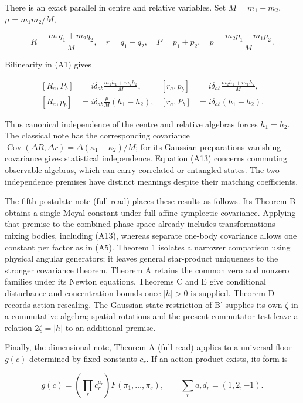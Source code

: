 \documentclass[11pt,a4paper]{article}
\begin{document}
There is an exact parallel in centre and relative variables. Set
\(M=m_1+m_2\), \(\mu=m_1m_2/M\),

\[
R=\frac{m_1q_1+m_2q_2}{M},\quad r=q_1-q_2,\quad
P=p_1+p_2,\quad p=\frac{m_2p_1-m_1p_2}{M}.
\]

Bilinearity in (A1) gives

\[
\begin{aligned}
{}[R_a,P_b]&=i\delta_{ab}\frac{m_1h_1+m_2h_2}{M},&
[r_a,p_b]&=i\delta_{ab}\frac{m_2h_1+m_1h_2}{M},\\
[R_a,p_b]&=i\delta_{ab}\frac{\mu}{M}(h_1-h_2),&
[r_a,P_b]&=i\delta_{ab}(h_1-h_2).
\end{aligned} \tag{A13}
\]

Thus canonical independence of the centre and relative algebras forces
\(h_1=h_2\). The classical note has the corresponding covariance
\(\operatorname{Cov}(\Delta R,\Delta r)=\Delta(\kappa_1-\kappa_2)/M\);
for its Gaussian preparations vanishing covariance gives statistical
independence. Equation (A13) concerns commuting observable algebras,
which can carry correlated or entangled states. The two independence
premises have distinct meanings despite their matching coefficients.

The \href{principia-fifth-postulate.md}{fifth-postulate note}
(full-read) places these results as follows. Its Theorem B obtains a
single Moyal constant under full affine symplectic covariance. Applying
that premise to the combined phase space already includes
transformations mixing bodies, including (A13), whereas separate
one-body covariance allows one constant per factor as in (A5). Theorem 1
isolates a narrower comparison using physical angular generators; it
leaves general star-product uniqueness to the stronger covariance
theorem. Theorem A retains the common zero and nonzero families under
its Newton equations. Theorems C and E give conditional disturbance and
concentration bounds once \(|h|>0\) is supplied. Theorem D records
action rescaling. The Gaussian state restriction of B' supplies its own
\(\zeta\) in a commutative algebra; spatial rotations and the present
commutator test leave a relation \(2\zeta=|h|\) to an additional
premise.

Finally, \href{action-unit-dimensional-selection.md}{the dimensional
note, Theorem A} (full-read) applies to a universal floor \(g(c)\)
determined by fixed constants \(c_r\). If an action product exists, its
form is

\[
g(c)=\left(\prod_r c_r^{a_r}\right)F(\pi_1,\ldots,\pi_s),\qquad
\sum_r a_r d_r=(1,2,-1). \tag{A14}
\]
\end{document}
